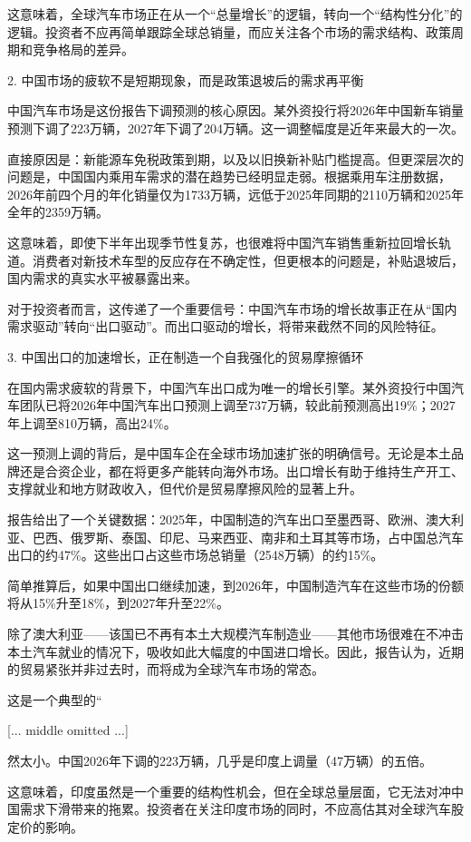\documentclass[11pt]{ctexart}
\begin{document}
这意味着，全球汽车市场正在从一个“总量增长”的逻辑，转向一个“结构性分化”的逻辑。投资者不应再简单跟踪全球总销量，而应关注各个市场的需求结构、政策周期和竞争格局的差异。

2. 中国市场的疲软不是短期现象，而是政策退坡后的需求再平衡

中国汽车市场是这份报告下调预测的核心原因。某外资投行将2026年中国新车销量预测下调了223万辆，2027年下调了204万辆。这一调整幅度是近年来最大的一次。

直接原因是：新能源车免税政策到期，以及以旧换新补贴门槛提高。但更深层次的问题是，中国国内乘用车需求的潜在趋势已经明显走弱。根据乘用车注册数据，2026年前四个月的年化销量仅为1733万辆，远低于2025年同期的2110万辆和2025年全年的2359万辆。

这意味着，即使下半年出现季节性复苏，也很难将中国汽车销售重新拉回增长轨道。消费者对新技术车型的反应存在不确定性，但更根本的问题是，补贴退坡后，国内需求的真实水平被暴露出来。

对于投资者而言，这传递了一个重要信号：中国汽车市场的增长故事正在从“国内需求驱动”转向“出口驱动”。而出口驱动的增长，将带来截然不同的风险特征。

3. 中国出口的加速增长，正在制造一个自我强化的贸易摩擦循环

在国内需求疲软的背景下，中国汽车出口成为唯一的增长引擎。某外资投行中国汽车团队已将2026年中国汽车出口预测上调至737万辆，较此前预测高出19\%；2027年上调至810万辆，高出24\%。

这一预测上调的背后，是中国车企在全球市场加速扩张的明确信号。无论是本土品牌还是合资企业，都在将更多产能转向海外市场。出口增长有助于维持生产开工、支撑就业和地方财政收入，但代价是贸易摩擦风险的显著上升。

报告给出了一个关键数据：2025年，中国制造的汽车出口至墨西哥、欧洲、澳大利亚、巴西、俄罗斯、泰国、印尼、马来西亚、南非和土耳其等市场，占中国总汽车出口的约47\%。这些出口占这些市场总销量（2548万辆）的约15\%。

简单推算后，如果中国出口继续加速，到2026年，中国制造汽车在这些市场的份额将从15\%升至18\%，到2027年升至22\%。

除了澳大利亚——该国已不再有本土大规模汽车制造业——其他市场很难在不冲击本土汽车就业的情况下，吸收如此大幅度的中国进口增长。因此，报告认为，近期的贸易紧张并非过去时，而将成为全球汽车市场的常态。

这是一个典型的“

[... middle omitted ...]

然太小。中国2026年下调的223万辆，几乎是印度上调量（47万辆）的五倍。

这意味着，印度虽然是一个重要的结构性机会，但在全球总量层面，它无法对冲中国需求下滑带来的拖累。投资者在关注印度市场的同时，不应高估其对全球汽车股定价的影响。
\end{document}
